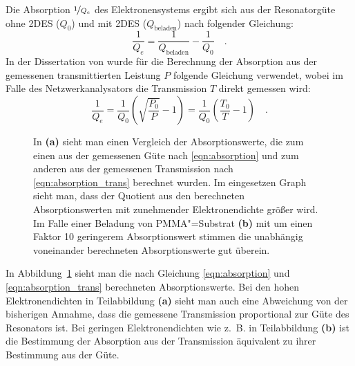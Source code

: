 Die Absorption $\nicefrac1{Q_e}$ des Elektronensystems ergibt sich aus der Resonatorgüte ohne 2DES ($Q_0$) und mit 2DES ($Q_\text{beladen}$) nach folgender Gleichung:
\begin{equation}
	\label{eqn:absorption}
	\frac1{Q_e}=\frac1{Q_\text{beladen}}-\frac1{Q_0}\quad.
\end{equation}
In der Dissertation von  \cite{guenzler} wurde für die Berechnung der Absorption aus der gemessenen transmittierten Leistung $P$ folgende Gleichung verwendet, wobei im Falle des Netzwerkanalysators die Transmission $T$ direkt gemessen wird:
\begin{equation}
	\label{eqn:absorption_trans}
		\frac1{Q_e}=\frac1{Q_0}\left(\sqrt{\frac{P_0}{P}}-1\right)=
			\frac1{Q_0}\left(\frac{T_0}{T}-1\right)\quad.
\end{equation}

\begin{figure}[h!tbp]
	\centerline{%
	}%
	\caption[Vergleich der Berechnung der Absorption aus Tranmission oder Güte]{In {\bfseries (a)} sieht man einen Vergleich der Absorptionswerte, die zum einen aus der gemessenen Güte nach \eqref{eqn:absorption} und zum anderen aus der gemessenen Transmission nach \eqref{eqn:absorption_trans} berechnet wurden. Im eingesetzen Graph sieht man, dass der Quotient aus den berechneten Absorptionswerten mit zunehmender Elektronendichte größer wird. Im Falle einer Beladung von PMMA"=Substrat {\bfseries (b)} mit um einen Faktor 10 geringerem Absorptionswert stimmen die unabhängig voneinander berechneten Absorptionswerte gut überein.}
	\label{fig:absorption}
\end{figure}

\enlargethispage{\baselineskip}
In Abbildung~\ref{fig:absorption} sieht man die nach Gleichung \eqref{eqn:absorption} und \eqref{eqn:absorption_trans} berechneten Absorptionswerte. Bei den hohen Elektronendichten in Teilabbildung {\bfseries (a)} sieht man auch eine Abweichung von der bisherigen Annahme, dass die gemessene Transmission proportional zur Güte des Resonators ist. Bei geringen Elektronendichten wie z.\ B. in Teilabbildung {\bfseries(b)}  ist die Bestimmung der Absorption aus der Transmission äquivalent zu ihrer Bestimmung aus der Güte.


